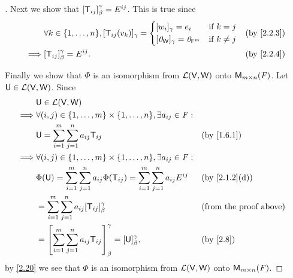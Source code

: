 \begin{proof}[]
  Next we show that \([\mathsf{T}_{i j}]_{\beta}^{\gamma} = E^{i j}\).
  This is true since
  \begin{align*}
             & \forall k \in \set{1, \dots, n}, [\T_{i j}(v_k)]_{\gamma} = \begin{dcases}
                                                                             [w_i]_{\gamma} = e_i                 & \text{if } k = j    \\
                                                                             [\zv_{\W}]_{\gamma} = \zv_{\vs{F}^m} & \text{if } k \neq j
                                                                           \end{dcases} &  & \by{2.2.3} \\
    \implies & [\T_{i j}]_{\beta}^{\gamma} = E^{i j}.                                       &  & \by{2.2.4}
  \end{align*}

  Finally we show that \(\Phi\) is an isomorphism from \(\mathcal{L}(\mathsf{V}, \mathsf{W})\) onto \(\ms\).
  Let \(\mathsf{U} \in \mathcal{L}(\mathsf{V}, \mathsf{W})\).
  Since
  \begin{align*}
             & \U \in \ls(\V, \W)                                                                                                                                 \\
    \implies & \forall (i, j) \in \set{1, \dots, m} \times \set{1, \dots, n}, \exists a_{i j} \in \F :                                                            \\
             & \U = \sum_{i = 1}^m \sum_{j = 1}^n a_{i j} \T_{i j}                                                             &  & \by{1.6.1}                    \\
    \implies & \forall (i, j) \in \set{1, \dots, m} \times \set{1, \dots, n}, \exists a_{i j} \in \F :                                                            \\
             & \Phi(\U) = \sum_{i = 1}^m \sum_{j = 1}^n a_{i j} \Phi(\T_{i j}) = \sum_{i = 1}^m \sum_{j = 1}^n a_{i j} E^{i j} &  & \by{2.1.2}[d]                 \\
             & = \sum_{i = 1}^m \sum_{j = 1}^n a_{i j} [\T_{i j}]_{\beta}^{\gamma}                                             &  & \text{(from the proof above)} \\
             & = \br{\sum_{i = 1}^m \sum_{j = 1}^n a_{i j} \T_{i j}}_{\beta}^{\gamma} = [\U]_{\beta}^{\gamma},                 &  & \by{2.8}
  \end{align*}
  by \cref{2.20} we see that \(\Phi\) is an isomorphism from \(\mathcal{L}(\mathsf{V}, \mathsf{W})\) onto \(\ms\).
\end{proof}

